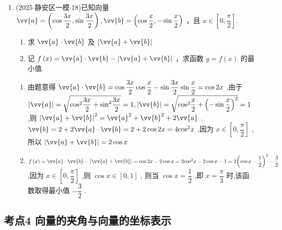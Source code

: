 \begin{enumerate}
    \item (2025$\cdot$静安区一模$\cdot$18)已知向量 $\vv{a} = \left( {\cos \dfrac{3x}{2},\sin \dfrac{3x}{2}}\right) ,\vv{b} = \left( {\cos \dfrac{x}{2}, - \sin \dfrac{x}{2}}\right)$ ，且 $x \in  \left\lbrack 0,\dfrac{\pi }{2}\right\rbrack$.
    \begin{enumerate}
        \item 求 $\vv{a} \cdot  \vv{b}$ 及 $\left| {\vv{a} + \vv{b}}\right|$
        \item 记 $f\left( x\right)  = \vv{a} \cdot  \vv{b} - \left| {\vv{a} + \vv{b}}\right|$ ，求函数 $y = f\left( x\right)$ 的最小值.
    \end{enumerate}
    \begin{jieda}
        \begin{enumerate}
            \item 由题意得 $\vv{a} \cdot  \vv{b} = \cos \dfrac{3x}{2}\cos \dfrac{x}{2} - \sin \dfrac{3x}{2}\sin \dfrac{x}{2} =  \cos {2x}$ ,由于 $\left| \vv{a}\right|  = \sqrt{{\cos }^{2}\dfrac{3x}{2} + {\sin }^{2}\dfrac{3x}{2}} = 1,\left| \vv{b}\right|  = \sqrt{{\cos }^{2}\dfrac{x}{2} + {\left( -\sin \dfrac{x}{2}\right) }^{2}} = 1$ ,则 ${\left| \vv{a} + \vv{b}\right| }^{2} = {\vv{a}}^{2} + {\vv{b}}^{2} + 2\vv{a}$ . $\vv{b} = 2 + 2\vv{a} \cdot  \vv{b} = 2 + 2\cos {2x} = 4{\cos }^{2}x$ ,因为 $x \in  \left\lbrack  {0,\dfrac{\pi }{2}}\right\rbrack$ ,所以 $\left| {\vv{a} + \vv{b}}\right|  = 2\cos x$
            
            \item $f\left( x\right)  = \vv{a} \cdot  \vv{b} - \left| {\vv{a} + \vv{b}}\right|  = \cos {2x} - 2\cos x = 2{\cos }^{2}x - 2\cos x - 1  = 2{\left( \cos x - \dfrac{1}{2}\right) }^{2} - \dfrac{3}{2}$ ,因为 $x \in  \left\lbrack  {0,\dfrac{\pi }{2}}\right\rbrack$ ,则 $\cos x \in  \left\lbrack  {0,1}\right\rbrack$ , 则当 $\cos x = \dfrac{1}{2}$ ,即 $x = \dfrac{\pi }{3}$ 时,该函数取得最小值 $- \dfrac{3}{2}$ .
        \end{enumerate}
    \end{jieda}
\end{enumerate}
\subsection*{考点4 向量的夹角与向量的坐标表示}

